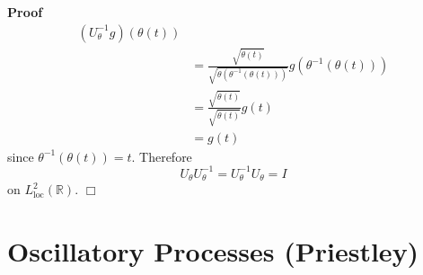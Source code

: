 \documentclass{article}
\newcommand{\tmop}[1]{\ensuremath{\operatorname{#1}}}
\newenvironment{proof}{\noindent\textbf{Proof\ }}{\hspace*{\fill}$\Box$\medskip}
\begin{document}
\begin{proof}
\begin{equation}
\begin{array}{ll}
      (U_{\theta}^{- 1} g) (\theta (t))\\
      & = \frac{\sqrt{\dot{\theta} (t)}}{\sqrt{\dot{\theta} (\theta^{- 1}
      (\theta (t)))}} g (\theta^{- 1} (\theta (t)))\\
      & = \frac{\sqrt{\dot{\theta} (t)}}{\sqrt{\dot{\theta} (t)}} g (t)\\
      & = g (t)
    \end{array}
  \end{equation}
  since $\theta^{- 1} (\theta (t)) = t$. Therefore
  \begin{equation}
    U_{\theta} U_{\theta}^{- 1} = U_{\theta}^{- 1} U_{\theta} = I
  \end{equation}
  on $L^2_{\tmop{loc}} (\mathbb{R})$.
\end{proof}

\section{Oscillatory Processes (Priestley)}\label{sec:oscillatory}
\end{document}
